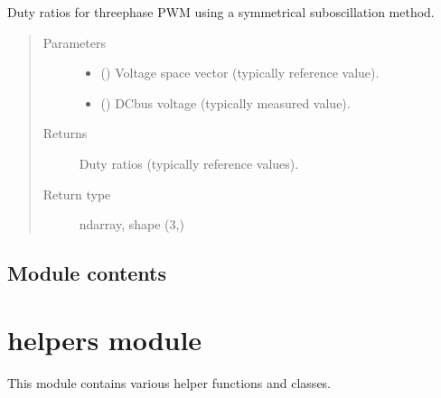 \documentclass[letterpaper,10pt,english]{sphinxmanual}
\begin{document}
\begin{fulllineitems}
\label{\detokenize{control:control.common.duty_ratios}}
\pysigstartsignatures
{}
\pysigstopsignatures
\sphinxAtStartPar
Duty ratios for three\sphinxhyphen{}phase PWM using a symmetrical suboscillation method.
\begin{quote}\begin{description}
\item[{Parameters}] \leavevmode\begin{itemize}
\item {} 
\sphinxAtStartPar
{} () \textendash{} Voltage space vector (typically reference value).

\item {} 
\sphinxAtStartPar
{} () \textendash{} DC\sphinxhyphen{}bus voltage (typically measured value).

\end{itemize}

\item[{Returns}] \leavevmode
\sphinxAtStartPar
{} \textendash{} Duty ratios (typically reference values).

\item[{Return type}] \leavevmode
\sphinxAtStartPar
ndarray, shape (3,)

\end{description}\end{quote}

\end{fulllineitems}



\subsection{Module contents}
\label{\detokenize{control:module-control}}\label{\detokenize{control:module-contents}}
\sphinxstepscope


\section{helpers module}
\label{\detokenize{helpers:module-helpers}}\label{\detokenize{helpers:helpers-module}}\label{\detokenize{helpers::doc}}
\sphinxAtStartPar
This module contains various helper functions and classes.
\end{document}
